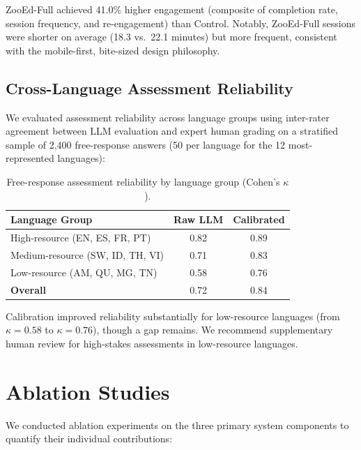 \documentclass[11pt,a4paper]{article}
\begin{document}
ZooEd-Full achieved 41.0\% higher engagement (composite of completion rate, session frequency, and re-engagement) than Control.
Notably, ZooEd-Full sessions were shorter on average (18.3 vs.\ 22.1 minutes) but more frequent, consistent with the mobile-first, bite-sized design philosophy.

\subsection{Cross-Language Assessment Reliability}

We evaluated assessment reliability across language groups using inter-rater agreement between LLM evaluation and expert human grading on a stratified sample of 2,400 free-response answers (50 per language for the 12 most-represented languages):

\begin{table}[H]
\centering
\caption{Free-response assessment reliability by language group (Cohen's $\kappa$).}
\label{tab:language_reliability}
\begin{tabular}{@{}lcc@{}}
\toprule
\textbf{Language Group} & \textbf{Raw LLM} & \textbf{Calibrated} \\
\midrule
High-resource (EN, ES, FR, PT) & 0.82 & 0.89 \\
Medium-resource (SW, ID, TH, VI) & 0.71 & 0.83 \\
Low-resource (AM, QU, MG, TN) & 0.58 & 0.76 \\
\midrule
\textbf{Overall} & 0.72 & 0.84 \\
\bottomrule
\end{tabular}
\end{table}

Calibration improved reliability substantially for low-resource languages (from $\kappa = 0.58$ to $\kappa = 0.76$), though a gap remains.
We recommend supplementary human review for high-stakes assessments in low-resource languages.

\section{Ablation Studies}
\label{sec:ablation}

We conducted ablation experiments on the three primary system components to quantify their individual contributions:
\end{document}
